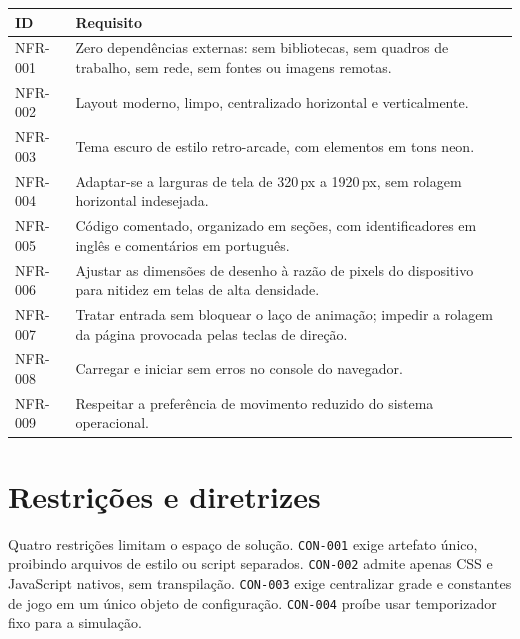 \begin{quadro}[htb]
	\caption{Requisitos não funcionais do sistema-alvo}
	\label{qua:nfr}
	\centering
	\footnotesize
	\begin{tabularx}{\textwidth}{@{}p{1.7cm} X@{}}
		\toprule
		\textbf{ID} & \textbf{Requisito} \\
		\midrule
		NFR-001 & Zero dependências externas: sem bibliotecas, sem quadros de trabalho, sem rede, sem fontes ou imagens remotas. \\
		\addlinespace
		NFR-002 & Layout moderno, limpo, centralizado horizontal e verticalmente. \\
		\addlinespace
		NFR-003 & Tema escuro de estilo retro-arcade, com elementos em tons neon. \\
		\addlinespace
		NFR-004 & Adaptar-se a larguras de tela de 320\,px a 1920\,px, sem rolagem horizontal indesejada. \\
		\addlinespace
		NFR-005 & Código comentado, organizado em seções, com identificadores em inglês e comentários em português. \\
		\addlinespace
		NFR-006 & Ajustar as dimensões de desenho à razão de pixels do dispositivo para nitidez em telas de alta densidade. \\
		\addlinespace
		NFR-007 & Tratar entrada sem bloquear o laço de animação; impedir a rolagem da página provocada pelas teclas de direção. \\
		\addlinespace
		NFR-008 & Carregar e iniciar sem erros no console do navegador. \\
		\addlinespace
		NFR-009 & Respeitar a preferência de movimento reduzido do sistema operacional. \\
		\bottomrule
	\end{tabularx}
\end{quadro}

\section{Restrições e diretrizes}
\label{sec:esp-restricoes}

Quatro restrições limitam o espaço de solução. \texttt{CON-001} exige artefato
único, proibindo arquivos de estilo ou script separados. \texttt{CON-002} admite
apenas CSS e JavaScript nativos, sem transpilação. \texttt{CON-003} exige
centralizar grade e constantes de jogo em um único objeto de configuração.
\texttt{CON-004} proíbe usar temporizador fixo para a simulação.

